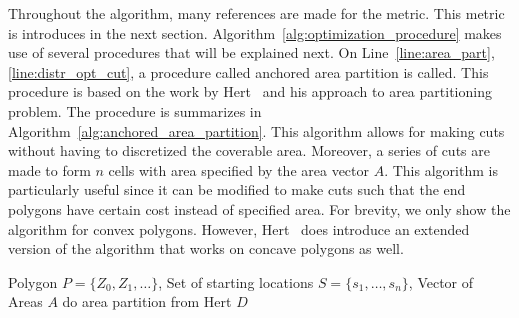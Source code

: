 \documentclass[../main.tex]{subfiles}
\begin{document}
Throughout the algorithm, many references are made for the metric. This metric is introduces in the next section. Algorithm~\ref{alg:optimization_procedure} makes use of several procedures that will be explained next. On Line~\ref{line:area_part},\ref{line:distr_opt_cut}, a procedure called anchored area partition is called. This procedure is based on the work by Hert~\cite{hert1998polygon} and his approach to area partitioning problem. The procedure is summarizes in Algorithm~\ref{alg:anchored_area_partition}. This algorithm allows for making cuts without having to discretized the coverable area. Moreover, a series of cuts are made to form $n$ cells with area specified by the area vector $A$. This algorithm is particularly useful since it can be modified to make cuts such that the end polygons have certain cost instead of specified area. For brevity, we only show the algorithm for convex polygons. However, Hert~\cite{hert1998polygon} does introduce an extended version of the algorithm that works on concave polygons as well.

\begin{algorithm}
	\caption{$\operatorname{anchored\_area\_partition}(P, S, A)$}
	\label{alg:anchored_area_partition}
	\begin{algorithmic}[1]
		\REQUIRE Polygon $P=\{Z_0,Z_1,\ldots\}$, Set of starting locations $S=\{s_1,\ldots,s_n\}$, Vector of Areas $A$
		\STATE do area partition from Hert
		\RETURN $D$
	\end{algorithmic}
\end{algorithm}

%
\end{document}
